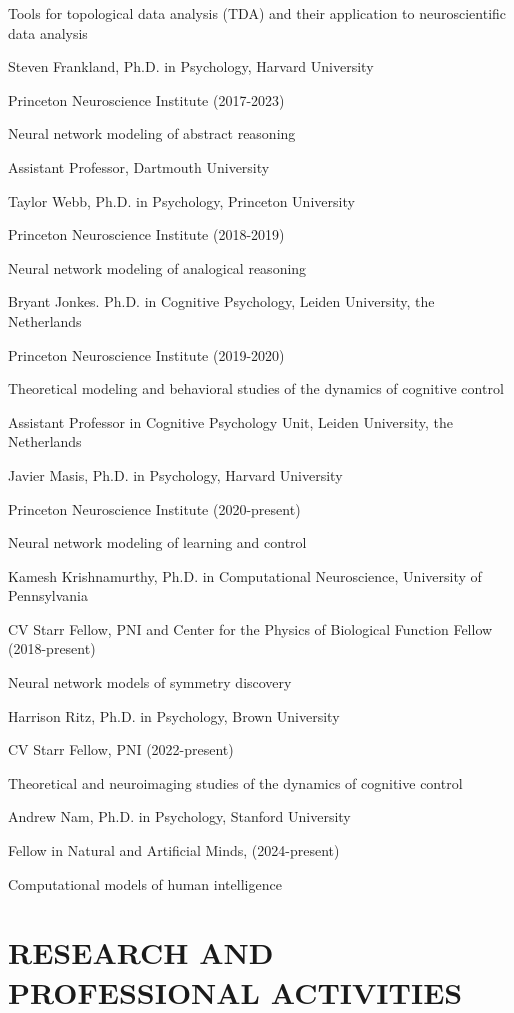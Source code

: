 \documentclass[10 pt]{article}
\begin{document}
Tools for topological data analysis (TDA) and their application to neuroscientific data analysis
    \medskip

Steven Frankland, Ph.D. in Psychology, Harvard University

Princeton Neuroscience Institute (2017-2023)

Neural network modeling of abstract reasoning

Assistant Professor, Dartmouth University
    \medskip

Taylor Webb, Ph.D. in Psychology, Princeton University

Princeton Neuroscience Institute (2018-2019)

Neural network modeling of analogical reasoning
    \medskip

Bryant Jonkes. Ph.D. in Cognitive Psychology, Leiden University, the Netherlands

Princeton Neuroscience Institute (2019-2020)

Theoretical modeling and behavioral studies of the dynamics of cognitive control

Assistant Professor in Cognitive Psychology Unit, Leiden University, the Netherlands
    \medskip


Javier Masis, Ph.D. in Psychology, Harvard University

Princeton Neuroscience Institute (2020-present)


Neural network modeling of learning and control
    \medskip

Kamesh Krishnamurthy, Ph.D. in Computational Neuroscience, University of Pennsylvania

CV Starr Fellow, PNI and Center for the Physics of Biological Function Fellow (2018-present)

Neural network models of symmetry discovery
    \medskip

Harrison Ritz, Ph.D. in Psychology, Brown University

CV Starr Fellow, PNI (2022-present)

Theoretical and neuroimaging studies of the dynamics of cognitive control
    \medskip

Andrew Nam, Ph.D. in Psychology, Stanford University

Fellow in Natural and Artificial Minds, (2024-present)

Computational models of human intelligence
    \medskip


\section*{RESEARCH AND PROFESSIONAL ACTIVITIES} \label{secRAPA}
\end{document}
